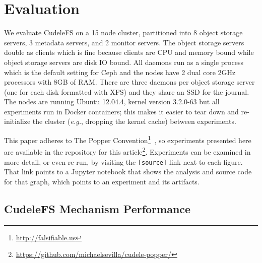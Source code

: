 \section{Evaluation}
\label{sec:evaluation}

We evaluate CudeleFS on a 15 node cluster, partitioned into 8 object storage
servers, 3 metadata servers, and 2 monitor servers. The object storage servers
double as clients which is fine because clients are CPU and memory bound while
object storage servers are disk IO bound. All daemons run as a single process
which is the default setting for Ceph and the nodes have 2 dual core 2GHz
processors with 8GB of RAM. There are three daemons per object storage server
(one for each disk formatted with XFS) and they share an SSD for the journal.
The nodes are running Ubuntu 12.04.4, kernel version 3.2.0-63 but all
experiments run in Docker containers; this makes it easier to tear down and
re-initialize the cluster ({\it e.g.}, dropping the kernel cache) between
experiments.

This paper adheres to The Popper
Convention\footnote{\url{http://falsifiable.us}}~\cite{jimenez_popper_2016}, so
experiments presented here are available in the repository for this
article\footnote{\url{https://github.com/michaelsevilla/cudele-popper/}}.
Experiments can be examined in more detail, or even re-run, by visiting the
\texttt{[source]} link next to each figure. That link points to a Jupyter
notebook that shows the analysis and source code for that graph, which points
to an experiment and its artifacts.


\subsection{CudeleFS Mechanism Performance}

